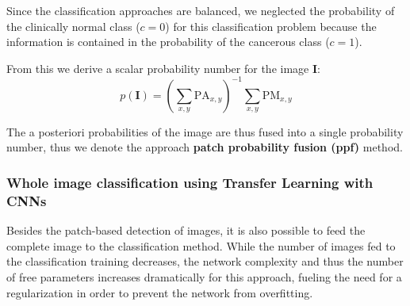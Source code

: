 \documentclass[fleqn,10pt]{wlscirep}
\begin{document}
Since the classification approaches are balanced, we neglected the
probability of the clinically normal class ($c=0$) for this classification problem because the information
is contained in the probability of the cancerous class ($c=1$).

From this we derive a scalar probability number for the image \textbf{I}:
\begin{equation}
     p(\mathbf{I}) = \left( \sum_{x,y} \mathrm{PA}_{x,y} \right)^{-1}
     \sum_{x,y} \mathrm{PM}_{x,y}
    \label{eqn:ppf}
\end{equation}






The a posteriori probabilities of the image are thus fused into a
single probability number, thus we denote the approach \textbf{patch probability
  fusion (ppf)} method. 


\vspace{0.5em}
\subsubsection{Whole image classification using Transfer Learning with CNNs}
\label{CNNimageDet}

Besides the patch-based detection of images, it is also possible to feed the complete image to the classification method. While the number of images fed to the classification training decreases, the network complexity and thus the number of free parameters increases dramatically for this approach, fueling the need for a regularization in order to prevent the network from overfitting.
\end{document}
